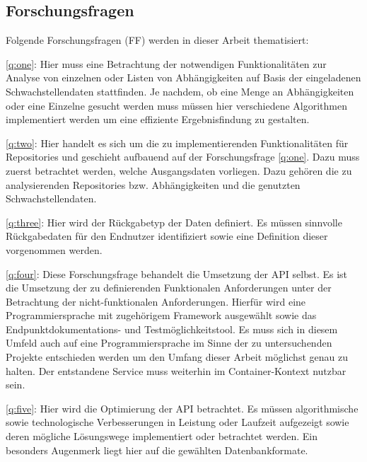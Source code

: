 \subsection{Forschungsfragen} \label{sec:Forschungsfragen}
    Folgende Forschungsfragen (FF) werden in dieser Arbeit thematisiert:

    \ref{q:one}:
    Hier muss eine Betrachtung der notwendigen Funktionalitäten zur Analyse von einzelnen oder Listen von Abhängigkeiten auf Basis der eingeladenen Schwachstellendaten stattfinden.
    Je nachdem, ob eine Menge an Abhängigkeiten oder eine Einzelne gesucht werden muss müssen hier verschiedene Algorithmen implementiert werden um eine effiziente Ergebnisfindung zu gestalten.

    \ref{q:two}:
    Hier handelt es sich um die zu implementierenden Funktionalitäten für Repositories und geschieht aufbauend auf der Forschungsfrage \ref{q:one}.
    Dazu muss zuerst betrachtet werden, welche Ausgangsdaten vorliegen.
    Dazu gehören die zu analysierenden Repositories bzw. Abhängigkeiten und die genutzten Schwachstellendaten.

    \ref{q:three}:
    Hier wird der Rückgabetyp der Daten definiert.
    Es müssen sinnvolle Rückgabedaten für den Endnutzer identifiziert sowie eine Definition dieser vorgenommen werden.

    \ref{q:four}:
    Diese Forschungsfrage behandelt die Umsetzung der \ac{API} selbst.
    Es ist die Umsetzung der zu definierenden Funktionalen Anforderungen unter der Betrachtung der nicht-funktionalen Anforderungen.
    Hierfür wird eine Programmiersprache mit zugehörigem Framework ausgewählt sowie das End\-punkt\-doku\-mentations- und Test\-möglich\-keits\-tool.
    Es muss sich in diesem Umfeld auch auf eine Programmiersprache im Sinne der zu untersuchenden Projekte entschieden werden um den Umfang dieser Arbeit möglichst genau zu halten.
    Der entstandene Service muss weiterhin im Container-Kontext nutzbar sein.

    \ref{q:five}:
    Hier wird die Optimierung der \ac{API} betrachtet.
    Es müssen algorithmische sowie technologische Verbesserungen in Leistung oder Laufzeit aufgezeigt sowie deren mögliche Lösungswege implementiert oder betrachtet werden.
    Ein besonders Augenmerk liegt hier auf die gewählten Datenbankformate.

